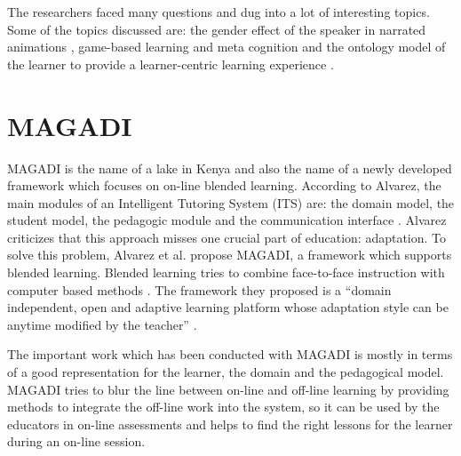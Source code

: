 The researchers faced many questions and
dug into a lot of interesting topics. Some of the topics discussed are: the gender effect
of the speaker in narrated animations \cite{Linek2006}, game-based learning
and meta cognition \cite{Castaigne} and the ontology model of the learner to
provide a learner-centric learning experience \cite{Kickmeier-Rust2008a}.


\section{MAGADI}
MAGADI is the name of a lake in Kenya and also the name of a newly developed
framework which focuses on on-line blended learning. According to Alvarez, the
main modules of an Intelligent Tutoring System (ITS) are: the domain model, the student
model, the pedagogic module and the communication interface \cite{Alvarez2007}. Alvarez
criticizes that this approach misses one crucial part of education:
adaptation. To solve this problem, Alvarez et al. propose MAGADI, a framework
which supports blended learning. Blended learning tries to combine
face-to-face instruction with computer based methods \cite{Graham2004a}. The framework they
proposed is a ``domain independent, open and adaptive learning platform whose
adaptation style can be anytime modified by the teacher'' \cite{Alvarez2007}.

The important work which has been conducted with MAGADI is mostly in terms of
a good representation for the learner, the domain and the pedagogical model.
MAGADI tries to blur the line between on-line and off-line learning by
providing methods to integrate the off-line work into the system, so it can be
used by the educators in on-line assessments and helps to find the right
lessons for the learner during an on-line session.


